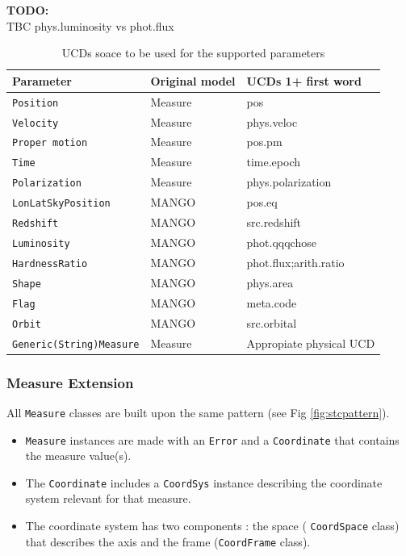 \documentclass[11pt,a4paper]{ivoa}
\newcommand{\TODO}[1]{%
    \noindent%
    \colorbox{todocolor}{%
            \parbox{0.85\linewidth}{\sffamily \textbf{TODO:}\\
            #1}
    }%
    \vspace{2pt}

}
\begin{document}
\TODO{TBC phys.luminosity  vs phot.flux}
\begin{table}[ht!]
     \begin{tabular}{|p{4.2cm}|p{3cm}|p{3.5cm}|}
       \hline Parameter &  Original model & UCDs 1+ first word  \\
       \hline  \texttt{Position}             &  Measure  &  pos \\
       \hline  \texttt{Velocity  }            &  Measure & phys.veloc      \\
       \hline  \texttt{Proper motion}    & Measure & pos.pm    \\
       \hline  \texttt{Time}                   & Measure &  time.epoch   \\
       \hline  \texttt{Polarization}         & Measure & phys.polarization \\
       \hline  \texttt{LonLatSkyPosition}    &  MANGO  &  pos.eq \\
       \hline  \texttt{Redshift}                        &  MANGO  & src.redshift \\
       \hline  \texttt{Luminosity}                    &  MANGO  & phot.qqqchose \\
       \hline  \texttt{HardnessRatio}             &  MANGO  & phot.flux;arith.ratio \\
       \hline  \texttt{Shape}                     &  MANGO  & phys.area \\
       \hline  \texttt{Flag}                        &  MANGO  & meta.code  \\
       \hline  \texttt{Orbit}                       &  MANGO  & src.orbital \\
       \hline  \texttt{Generic(String)Measure}    &  Measure  &  Appropiate physical UCD \\
       \hline
     \end{tabular}
     \caption{ UCDs soace to be used for the supported parameters}
     \label{tab:ucds}
 \end{table}



\subsubsection{Measure Extension}

All \texttt{Measure} classes are built upon the same pattern (see Fig \ref{fig:stcpattern}). 
\begin{itemize}
  \item  \texttt{Measure} instances are made with an \texttt{Error} and a \texttt{Coordinate} that contains the measure value(s).
   \item  The  \texttt{Coordinate} includes a  \texttt{CoordSys} instance describing the coordinate system relevant for that measure.
   \item The coordinate system has two components : the space  ( \texttt{CoordSpace} class) that describes the axis and the frame (\texttt{CoordFrame} class).  
 \end{itemize}
 
\end{document}
